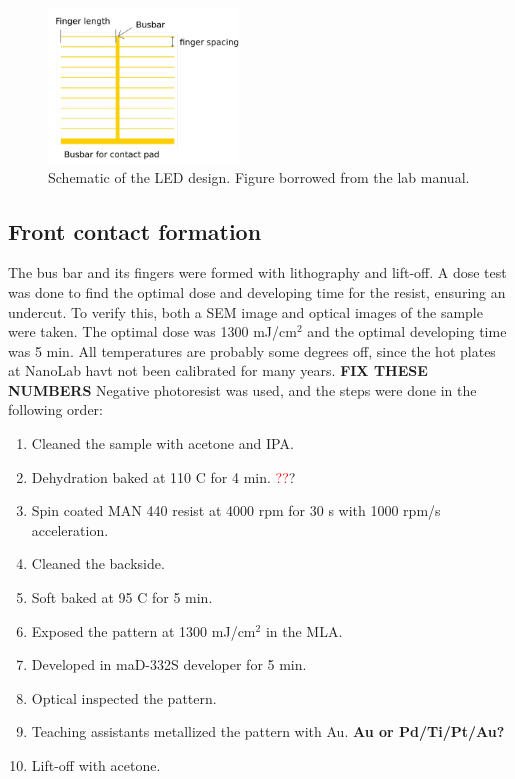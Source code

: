 \begin{figure}[ht]
    \centering
    \includegraphics[width=0.45\textwidth]{figures/LED_schematic.jpg}
    \caption{
        Schematic of the LED design.
        Figure borrowed from the lab manual.
    }
    \label{fig:led_schematic}
\end{figure}


\subsection{Front contact formation}
\label{methods:front_contact}

The bus bar and its fingers were formed with lithography and lift-off.
A dose test was done to find the optimal dose and developing time for the resist, ensuring an undercut.
To verify this, both a SEM image and optical images of the sample were taken.
The optimal dose was 1300 mJ/cm$^2$ and the optimal developing time was 5 min.
All temperatures are probably some degrees off, since the hot plates at NanoLab havt not been calibrated for many years.
\textbf{FIX THESE NUMBERS}
Negative photoresist was used, and the steps were done in the following order:
\begin{enumerate}
    \item Cleaned the sample with acetone and IPA.
    \item Dehydration baked at 110 \textdegree C for 4 min. \textcolor{red}{??}?
    \item Spin coated MAN 440 resist at 4000 rpm for 30 s with 1000 rpm/s acceleration.
    \item Cleaned the backside.
    \item Soft baked at 95 \textdegree C for 5 min.
    \item Exposed the pattern at 1300 mJ/cm$^2$ in the MLA.
    \item Developed in maD-332S developer for 5 min.
    \item Optical inspected the pattern.
    \item Teaching assistants metallized the pattern with Au. \textbf{Au or Pd/Ti/Pt/Au?}
    \item Lift-off with acetone.
\end{enumerate}

